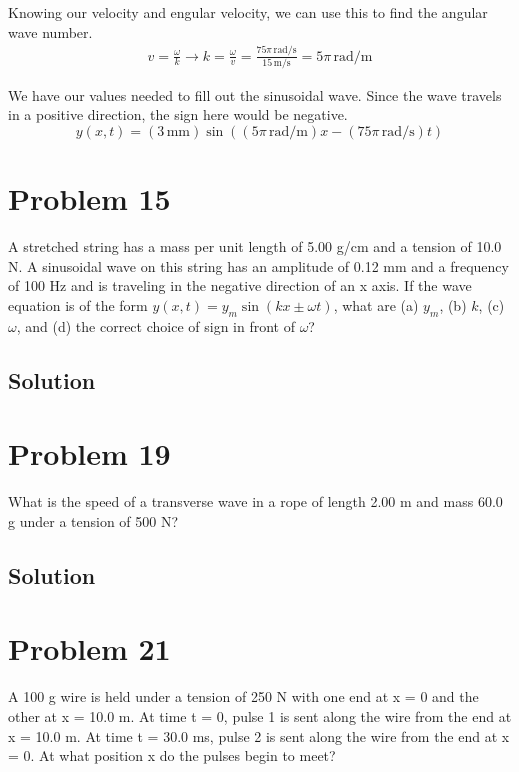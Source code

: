 \documentclass[12pt]{article}
\begin{document}
            Knowing our velocity and engular velocity, we can use this to find the angular wave number.
            \begin{gather}
                v   =   \frac{\omega}{k} \to
                k   =   \frac{\omega}{v}
                    =   \frac{75\pi\,\unit{\radian/\second}}{15\,\unit{\meter/\second}}
                    =   5\pi\,\unit{\radian/\meter}
            \end{gather}

            We have our values needed to fill out the sinusoidal wave.
            Since the wave travels in a positive direction, the sign here would be negative.
            \begin{equation}
                \boxed{y(x,t) = (3\,\unit{\milli\meter})\sin((5\pi\,\unit{\radian/\meter})x - (75\pi\,\unit{\radian/\second})t)}
            \end{equation}

    \section{Problem 15}
        A stretched string has a mass per unit length of 5.00 g/cm and a tension of 10.0 N. 
        A sinusoidal wave on this string has an amplitude of 0.12 mm and a frequency of 100 Hz and is traveling in the negative direction of an x axis. 
        If the wave equation is of the form $y(x, t) = y_m \sin(kx \pm \omega t)$, what are (a) $y_m$, (b) $k$, (c) $\omega$, and (d) the correct choice of sign in front of $\omega$?

        \subsection{Solution}

    \section{Problem 19}
        What is the speed of a transverse wave in a rope of length 2.00 m and mass 60.0 g under a tension of 500 N?

        \subsection{Solution}

    \section{Problem 21}
        A 100 g wire is held under a tension of 250 N with one end at x = 0 and the other at x = 10.0 m. 
        At time t = 0, pulse 1 is sent along the wire from the end at x = 10.0 m. 
        At time t = 30.0 ms, pulse 2 is sent along the wire from the end at x = 0. 
        At what position x do the pulses begin to meet?
\end{document}
